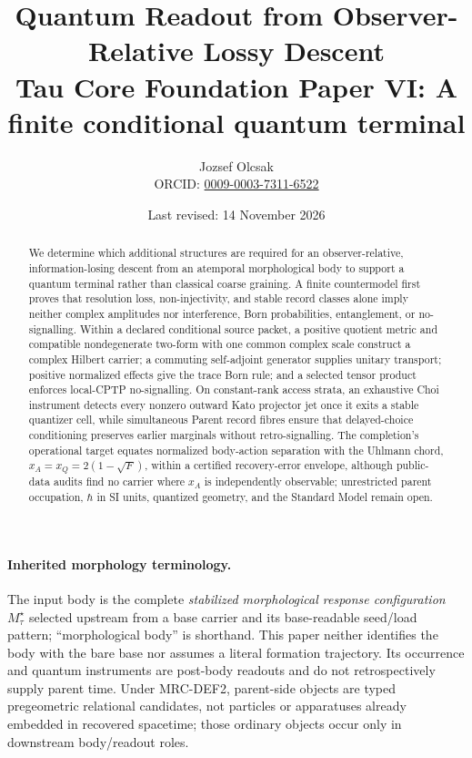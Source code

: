 \documentclass[11pt]{article}
\title{\textbf{Quantum Readout from Observer-Relative Lossy Descent}\\
\large Tau Core Foundation Paper VI: A finite conditional quantum terminal}
\author{Jozsef Olcsak\\{\small ORCID: \href{https://orcid.org/0009-0003-7311-6522}{0009-0003-7311-6522}}}
\date{Last revised: 14 November 2026}
\begin{document}
\maketitle

\begin{abstract}
We determine which additional structures are required for an observer-relative, information-losing descent from an atemporal morphological body to support a quantum terminal rather than classical coarse graining. A finite countermodel first proves that resolution loss, non-injectivity, and stable record classes alone imply neither complex amplitudes nor interference, Born probabilities, entanglement, or no-signalling. Within a declared conditional source packet, a positive quotient metric and compatible nondegenerate two-form with one common complex scale construct a complex Hilbert carrier; a commuting self-adjoint generator supplies unitary transport; positive normalized effects give the trace Born rule; and a selected tensor product enforces local-CPTP no-signalling. On constant-rank access strata, an exhaustive Choi instrument detects every nonzero outward Kato projector jet once it exits a stable quantizer cell, while simultaneous Parent record fibres ensure that delayed-choice conditioning preserves earlier marginals without retro-signalling. The completion's operational target equates normalized body-action separation with the Uhlmann chord, \(x_A=x_Q=2(1-\sqrt F)\), within a certified recovery-error envelope, although public-data audits find no carrier where \(x_A\) is independently observable; unrestricted parent occupation, \(\hbar\) in SI units, quantized geometry, and the Standard Model remain open.
\end{abstract}

\paragraph{Inherited morphology terminology.}
The input body is the complete \emph{stabilized morphological response
configuration} $M_\tau^\star$ selected upstream from a base carrier and its
base-readable seed/load pattern; ``morphological body'' is shorthand.  This
paper neither identifies the body with the bare base nor assumes a literal
formation trajectory.  Its occurrence and quantum instruments are post-body
readouts and do not retrospectively supply parent time.
Under MRC-DEF2, parent-side objects are typed pregeometric relational
candidates, not particles or apparatuses already embedded in recovered
spacetime; those ordinary objects occur only in downstream body/readout roles.
\end{document}
